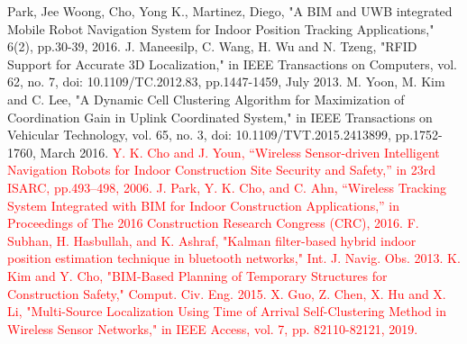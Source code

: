 \documentclass[conference]{IEEEtran}
\begin{document}
\begin{thebibliography}{00}
     Park, Jee Woong, Cho, Yong K., Martinez, Diego, "A BIM and UWB integrated Mobile Robot Navigation System for Indoor Position Tracking Applications," 6(2), pp.30-39, 2016.
     J. Maneesilp, C. Wang, H. Wu and N. Tzeng, "RFID Support for Accurate 3D Localization," in IEEE Transactions on Computers, vol. 62, no. 7, doi: 10.1109/TC.2012.83, pp.1447-1459, July 2013.
     M. Yoon, M. Kim and C. Lee, "A Dynamic Cell Clustering Algorithm for Maximization of Coordination Gain in Uplink Coordinated System," in IEEE Transactions on Vehicular Technology, vol. 65, no. 3, doi: 10.1109/TVT.2015.2413899, pp.1752-1760, March 2016.
    \textcolor{red}{
         Y. K. Cho and J. Youn, “Wireless Sensor-driven Intelligent Navigation Robots for Indoor Construction Site Security and Safety,” in 23rd ISARC, pp.493–498, 2006.
         J. Park, Y. K. Cho, and C. Ahn, “Wireless Tracking System Integrated with BIM for Indoor Construction Applications,” in Proceedings of The 2016 Construction Research Congress (CRC), 2016.
         F. Subhan, H. Hasbullah, and K. Ashraf, "Kalman filter-based hybrid indoor position estimation technique in bluetooth networks," Int. J. Navig. Obs. 2013.
         K. Kim and Y. Cho, "BIM-Based Planning of Temporary Structures for Construction Safety," Comput. Civ. Eng. 2015.
         X. Guo, Z. Chen, X. Hu and X. Li, "Multi-Source Localization Using Time of Arrival Self-Clustering Method in Wireless Sensor Networks," in IEEE Access, vol. 7, pp. 82110-82121, 2019.
    }
\end{thebibliography}
\end{document}
